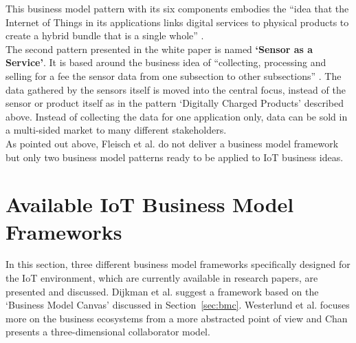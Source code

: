 	This business model pattern with its six components embodies the ``idea that the Internet of Things in its applications links digital services to physical products to create a hybrid bundle that is a single whole'' \cite{fleisch}.\\
	The second pattern presented in the white paper is named \textbf{`Sensor as a Service'}. It is based around the business idea of ``collecting, processing and selling for a fee the sensor data from one subsection to other subsections'' \cite{fleisch}. The data gathered by the sensors itself is moved into the central focus, instead of the sensor or product itself as in the pattern `Digitally Charged Products' described above. Instead of collecting the data for one application only, data can be sold in a multi-sided market to many different stakeholders.\\
	As pointed out above, Fleisch et al. do not deliver a business model framework but only two business model patterns ready to be applied to IoT business ideas.
	\vspace{-1em}
\section{Available IoT Business Model Frameworks}
\label{sec:bmf_available}
\vspace{-1em}
	In this section, three different business model frameworks specifically designed for the IoT environment, which are currently available in research papers, are presented and discussed. Dijkman et al. suggest a framework based on the `Business Model Canvas' discussed in Section~\ref{sec:bmc}. Westerlund et al. focuses more on the business ecosystems from a more abstracted point of view and Chan presents a three-dimensional collaborator model.
	\vspace{-1em}
